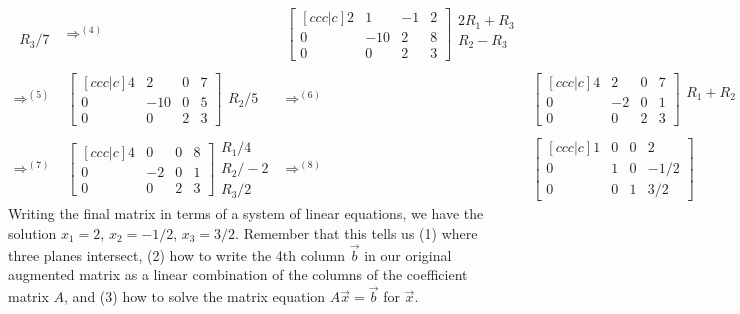 {\begin{example}
$$\begin{array}{rlcl}
 \begin{array}{lr}\ \\ \ \\R_3/7 \end{array}
&\Rightarrow^{(4)}& 
\begin{bmatrix}[ccc|c] 2&1&-1&2\\0&-10&2&8\\0&0&2&3\end{bmatrix} 
\begin{array}{l} 2R_1+R_3\\R_2-R_3\\ \ \end{array}
\\ \\ \Rightarrow^{(5)}&
 \begin{bmatrix}[ccc|c] 4&2&0&7\\0&-10&0&5\\0&0&2&3\end{bmatrix}  
 \begin{array}{lr}\ \\R_2/5\\ \ \end{array} 
&\Rightarrow^{(6)}& 
\begin{bmatrix}[ccc|c] 4&2&0&7\\0&-2&0&1\\0&0&2&3\end{bmatrix}  
\begin{array}{lr} R_1+R_2\\ \ \\ \ \end{array}
\\ \\ \Rightarrow^{(7)}&
\begin{bmatrix}[ccc|c] 4&0&0&8\\0&-2&0&1\\0&0&2&3\end{bmatrix} 
\begin{array}{lr} R_1/4\\R_2/-2\\R_3/2 \end{array}
&\Rightarrow^{(8)}&  
\begin{bmatrix}[ccc|c] 1&0&0&2\\0&1&0&-1/2\\0&0&1&3/2\end{bmatrix} 
\end{array}
$$
Writing the final matrix in terms of a system of linear equations, we have the solution {$x_1=2$, $x_2=-1/2$, $x_3=3/2$}. Remember that this tells us (1) where three planes intersect, (2) how to write the 4th column $\vec b$ in our original augmented matrix as a linear combination of the columns of the coefficient matrix $A$, and (3) how to solve the matrix equation $A\vec x = \vec b$ for $\vec x$.
\end{example}


}

